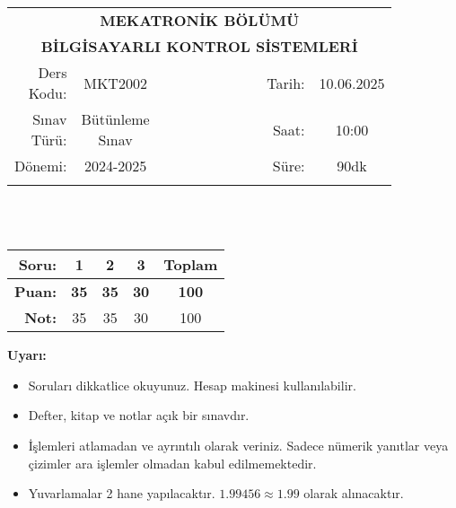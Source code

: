 \newcommand\UniversiteAdi{Niğde Ömer Halisdemir Üniversitesi}
\newcommand\BolumAdi{MEKATRONİK BÖLÜMÜ}
\newcommand\DersKodu{MKT2002}
\newcommand\DersAdi{BİLGİSAYARLI KONTROL SİSTEMLERİ}
\newcommand\SinavAdi{Bütünleme Sınav}
\newcommand\SinavTarihi{10.06.2025}
\newcommand\SinavSaati{10:00}
\newcommand\SinavSuresi{90dk}

\pagestyle{fancy}
\fancyhf{} %
\noindent
\begin{tabular}{
    p{0.15\linewidth}
    p{0.15\linewidth}
    p{0.3\linewidth}
    p{0.1\linewidth}
    p{0.15\linewidth}}
    \multicolumn{5}{c}{\textbf{\BolumAdi}}\\
    \multicolumn{5}{c}{\textbf{\DersAdi}}\\\hline
    \multicolumn{1}{|r|}{Ders Kodu:}&
    \multicolumn{1}{|c|}{\DersKodu}&
    \multicolumn{1}{|c|}{}& 
    \multicolumn{1}{|r|}{Tarih:}&
    \multicolumn{1}{|c|}{\SinavTarihi} \\\hline
    \multicolumn{1}{|r|}{Sınav Türü:}&
    \multicolumn{1}{|c|}{\SinavAdi}&  
    \multicolumn{1}{|c|}{}&
    \multicolumn{1}{|r|}{Saat:}&
    \multicolumn{1}{|c|}{\SinavSaati}\\\hline
    \multicolumn{1}{|r|}{Dönemi:}&
    \multicolumn{1}{|c|}{2024-2025}&
    \multicolumn{1}{|c|}{}&
    \multicolumn{1}{|r|}{Süre:}&
    \multicolumn{1}{|c|}{\SinavSuresi} \\\hline
    &&&&\\
\end{tabular}\\\\
\noindent\begin{center}
\begin{tabular}{|r|c|c|c|c|}\hline
    \textbf{Soru:}&
    \textbf{1}&
    \textbf{2}&
    \textbf{3}&
    \textbf{Toplam}\\\hline
    \textbf{Puan:}&
    \textbf{35}&
    \textbf{35}&
    \textbf{30}&
    \textbf{100}\\\hline
    \textbf{Not:}&35&35&30&100\\\hline
\end{tabular}\end{center}
\noindent\textbf{Uyarı:}
\begin{itemize}\bfseries
    \item Soruları dikkatlice okuyunuz. Hesap makinesi kullanılabilir.
    \item Defter, kitap ve notlar açık bir sınavdır.
    \item İşlemleri atlamadan ve ayrıntılı olarak veriniz. Sadece nümerik yanıtlar veya çizimler ara işlemler olmadan kabul edilmemektedir.
    \item Yuvarlamalar 2 hane yapılacaktır. $\mathbf{1.99456\approx1.99}$ olarak alınacaktır.
\end{itemize}

